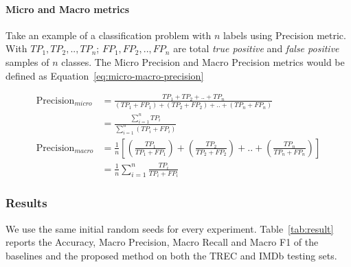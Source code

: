 \documentclass[sn-mathphys,Numbered]{sn-jnl}%
\theoremstyle{thmstyleone}%
\theoremstyle{thmstyletwo}%
\theoremstyle{thmstylethree}%
\begin{document}
\paragraph{Micro and Macro metrics}
Take an example of a classification problem with $n$ labels using Precision metric. With $TP_1, TP_2, .., TP_n$; $FP_1, FP_2, .., FP_n$ are total \textit{true positive} and \textit{false positive} samples of $n$ classes. The Micro Precision and Macro Precision metrics would be defined as Equation~\ref{eq:micro-macro-precision}

\begin{equation}\label{eq:micro-macro-precision}
\begin{aligned}
\text{Precision}_{micro} &= \frac{TP_1 + TP_2 + .. + TP_n}{(TP_1 + FP_1) + (TP_2 + FP_2) + .. + (TP_n + FP_n)} \\
&= \frac{\displaystyle\sum_{i = 1}^n TP_i}{\displaystyle\sum_{i = 1}^n (TP_i + FP_i)} \\
\text{Precision}_{macro} &= \frac{1}{n}\left[\left(\frac{TP_1}{TP_1 + FP_1}\right) + \left(\frac{TP_2}{TP_2 + FP_2}\right) + .. + \left(\frac{TP_n}{TP_n + FP_n}\right)\right] \\
&= \frac{1}{n}\sum_{i = 1}^n \frac{TP_i}{TP_i + FP_i}
\end{aligned}
\end{equation}

\subsubsection{Results}
We use the same initial random seeds for every experiment. Table~\ref{tab:result} reports the Accuracy, Macro Precision, Macro Recall and Macro F1 of the baselines and the proposed method on both the TREC and IMDb testing sets.
\end{document}
